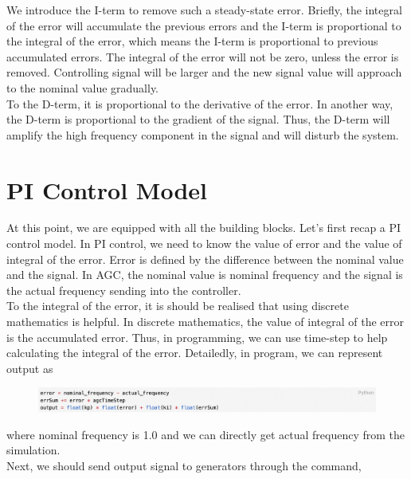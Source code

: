 \documentclass{report}
\begin{document}
We introduce the I-term to remove such a steady-state error. Briefly, the integral of the error will accumulate the previous errors and the I-term is proportional to the integral of the error, which means the I-term is proportional to previous accumulated errors. The integral of the error will not be zero, unless the error is removed. Controlling signal will be larger and the new signal value will approach to the nominal value gradually.\\

To the D-term, it is proportional to the derivative of the error. In another way, the D-term is proportional to the gradient of the signal. Thus, the D-term will amplify the high frequency component in the signal and will disturb the system.\\


\section{PI Control Model} %
At this point, we are equipped with all the building blocks. Let’s first recap a PI control model. In PI control, we need to know the value of error and the value of integral of the error. Error is defined by the difference between the nominal value and the signal. In AGC, the nominal value is nominal frequency and the signal is the actual frequency sending into the controller.\\

To the integral of the error,  it is should be realised that using discrete mathematics is helpful. In discrete mathematics, the value of integral of the error is the accumulated error. Thus, in programming, we can use time-step to help calculating the integral of the error.  Detailedly, in program, we can represent output as\\

\begin{figure}[htbp]
\centering
\includegraphics[width = .999\textwidth]{figure/3_3_code1.png}
\label{3_3_code1}
\end{figure}

where nominal frequency is 1.0 and we can directly get actual frequency from the simulation.\\

Next, we should send output signal to generators through the command,\\
\end{document}
